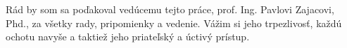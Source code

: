 Rád by som sa poďakoval vedúcemu tejto práce, prof. Ing. Pavlovi Zajacovi, Phd., za všetky rady, pripomienky a vedenie. Vážim si jeho trpezlivosť, každú ochotu navyše a taktiež jeho priateľský a úctivý prístup. 
